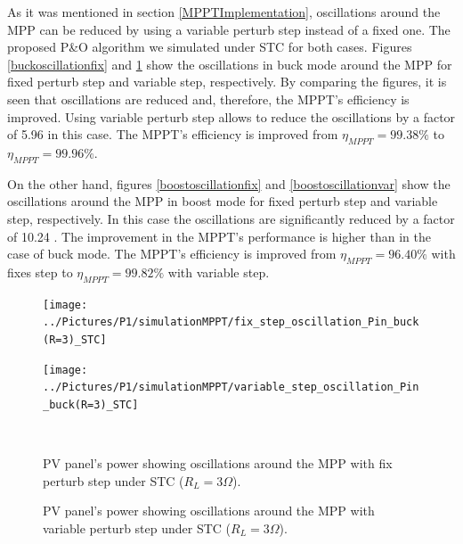 As it was mentioned in section \ref{MPPTImplementation}, oscillations around the MPP can be reduced by using a variable perturb step instead of a fixed one. The proposed P\&O algorithm we simulated under STC for both cases. Figures \ref{buckoscillationfix} and \ref{buckoscillationvar} show the oscillations in buck mode around the MPP for fixed perturb step and variable step, respectively. By comparing the figures, it is seen that oscillations are reduced and, therefore, the MPPT's efficiency is improved. Using variable perturb step allows to reduce the oscillations by a factor of 5.96 in this case. The MPPT's efficiency is improved from $\eta_{MPPT} = 99.38\% $ to $\eta_{MPPT} = 99.96\% $. 

On the other hand, figures \ref{boostoscillationfix} and \ref{boostoscillationvar} show the oscillations around the MPP in boost mode for fixed perturb step and variable step, respectively. In this case the oscillations are significantly reduced by a factor of 10.24 . The improvement in the MPPT's performance is higher than in the case of buck mode. The MPPT's efficiency is improved from $\eta_{MPPT} = 96.40\% $ with fixes step to $\eta_{MPPT} = 99.82\% $ with variable step. 

\begin{figure}[H]
	\begin{minipage}[c]{0.5\textwidth}
		\centering
		\texttt{[image: ../Pictures/P1/simulationMPPT/fix\_step\_oscillation\_Pin\_buck(R=3)\_STC]} %
	\end{minipage}%
	\hfill
	\begin{minipage}[c]{0.5\textwidth}
		\centering
		\texttt{[image: ../Pictures/P1/simulationMPPT/variable\_step\_oscillation\_Pin\_buck(R=3)\_STC]} %
	\end{minipage} \\ %
	\begin{minipage}[t]{0.45\textwidth}
		\caption{PV panel's power showing oscillations around the MPP with fix perturb step under STC ($R_{L}=3\Omega$).} %
		\label{buckoscillationfix}
	\end{minipage}%
	\hfill
	\begin{minipage}[t]{0.45\textwidth}
		\caption{PV panel's power showing oscillations around the MPP with variable perturb step under STC ($R_{L}=3\Omega$).} %
		\label{buckoscillationvar}
	\end{minipage}
\end{figure}


